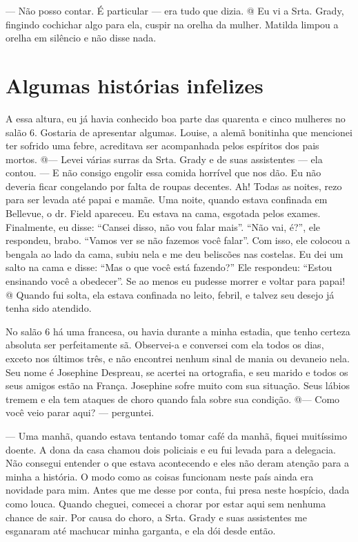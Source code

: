 --- Não posso contar. É particular --- era tudo que dizia. @ Eu vi a
Srta. Grady, fingindo cochichar algo para ela, cuspir na orelha da
mulher. Matilda limpou a orelha em silêncio e não disse nada.

\label{section-8}

\chapter{Algumas histórias
infelizes}\label{capuxedtulo-xiv-algumas-histuxf3rias-infelizes}

A essa altura, eu já havia conhecido boa parte das quarenta e cinco
mulheres no salão 6. Gostaria de apresentar algumas. Louise, a alemã
bonitinha que mencionei ter sofrido uma febre, acreditava ser
acompanhada pelos espíritos dos pais mortos. @--- Levei várias surras da
Srta. Grady e de suas assistentes --- ela contou. --- E não consigo
engolir essa comida horrível que nos dão. Eu não deveria ficar
congelando por falta de roupas decentes. Ah! Todas as noites, rezo para
ser levada até papai e mamãe. Uma noite, quando estava confinada em
Bellevue, o dr. Field apareceu. Eu estava na cama, esgotada pelos
exames. Finalmente, eu disse: ``Cansei disso, não vou falar mais''.
``Não vai, é?'', ele respondeu, brabo. ``Vamos ver se não fazemos você
falar''. Com isso, ele colocou a bengala ao lado da cama, subiu nela e
me deu beliscões nas costelas. Eu dei um salto na cama e disse: ``Mas o
que você está fazendo?'' Ele respondeu: ``Estou ensinando você a
obedecer''. Se ao menos eu pudesse morrer e voltar para papai! @ Quando
fui solta, ela estava confinada no leito, febril, e talvez seu desejo já
tenha sido atendido.

No salão 6 há uma francesa, ou havia durante a minha estadia, que tenho
certeza absoluta ser perfeitamente sã. Observei-a e conversei com ela
todos os dias, exceto nos últimos três, e não encontrei nenhum sinal de
mania ou devaneio nela. Seu nome é Josephine Despreau, se acertei na
ortografia, e seu marido e todos os seus amigos estão na França.
Josephine sofre muito com sua situação. Seus lábios tremem e ela tem
ataques de choro quando fala sobre sua condição. @--- Como você veio
parar aqui? --- perguntei.

--- Uma manhã, quando estava tentando tomar café da manhã, fiquei
muitíssimo doente. A dona da casa chamou dois policiais e eu fui levada
para a delegacia. Não consegui entender o que estava acontecendo e eles
não deram atenção para a minha a história. O modo como as coisas
funcionam neste país ainda era novidade para mim. Antes que me desse por
conta, fui presa neste hospício, dada como louca. Quando cheguei,
comecei a chorar por estar aqui sem nenhuma chance de sair. Por causa do
choro, a Srta. Grady e suas assistentes me esganaram até machucar minha
garganta, e ela dói desde então.

